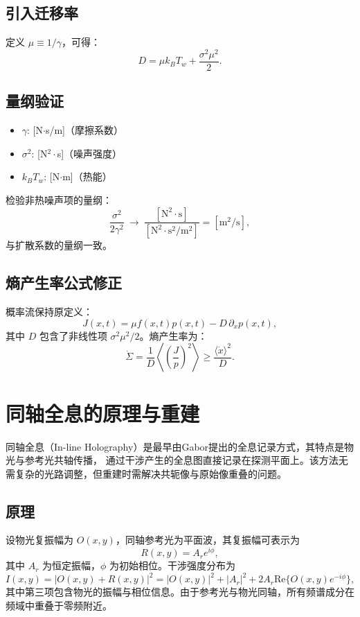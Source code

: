 \documentclass[a4paper,draft]{report} %
\begin{document}
\subsection{引入迁移率}
定义 $\mu \equiv 1/\gamma$，可得：
\begin{equation}
D = \mu k_B T_w + \frac{\sigma^2 \mu^2}{2}.
\end{equation}

\subsection{量纲验证}
\begin{itemize}
    \item $\gamma$: [N$\cdot$s/m]（摩擦系数）
    \item $\sigma^2$: [N$^{2}\cdot$s]（噪声强度）
    \item $k_B T_w$: [N$\cdot$m]（热能）
\end{itemize}
检验非热噪声项的量纲：
\begin{equation}
\frac{\sigma^2}{2\gamma^2} \ \rightarrow\  \frac{\mathrm{[N^2 \cdot s]}}{\mathrm{[N^2 \cdot s^2 / m^2]}} = \mathrm{[m^2/s]},
\end{equation}
与扩散系数的量纲一致。

\subsection{熵产生率公式修正}
概率流保持原定义：
\begin{equation}
J(x,t) = \mu f(x,t)p(x,t) - D \, \partial_x p(x,t),
\end{equation}
其中 $D$ 包含了非线性项 $\sigma^2 \mu^2 / 2$。熵产生率为：
\begin{equation}
\dot{\Sigma} = \frac{1}{D} \left\langle \left( \frac{J}{p} \right)^2 \right\rangle
\geq \frac{\langle \dot{x} \rangle^2}{D}.
\end{equation}

\section{同轴全息的原理与重建}
同轴全息（In-line Holography）是最早由Gabor提出的全息记录方式，其特点是物光与参考光共轴传播，
通过干涉产生的全息图直接记录在探测平面上。该方法无需复杂的光路调整，但重建时需解决共轭像与原始像重叠的问题。
\subsection{原理}
设物光复振幅为 $O(x,y)$，同轴参考光为平面波，其复振幅可表示为
\begin{equation}
R(x,y) = A_r e^{i\phi},
\end{equation}
其中 $A_r$ 为恒定振幅，$\phi$ 为初始相位。干涉强度分布为
\begin{equation}
I(x,y) = |O(x,y) + R(x,y)|^2 = |O(x,y)|^2 + |A_r|^2 + 2A_r \text{Re}\{O(x,y)e^{-i\phi}\},
\end{equation}
其中第三项包含物光的振幅与相位信息。由于参考光与物光同轴，所有频谱成分在频域中重叠于零频附近。
\end{document}
